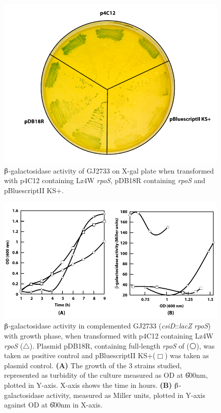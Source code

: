\begin{figure}[tbp]
\begin{narrow}{-1in}{-1in}
\centering
\includegraphics{figures/chap5_csid_lacz}
\end{narrow}
\caption[$\betaup$-galactosidase activity of GJ2733 on X-gal
plate]{$\betaup$-galactosidase activity of GJ2733 on X-gal plate
when transformed with p4C12 containing Lz4W \emph{rpoS}, pDB18R
containing  \emph{rpoS} and pBluescriptII KS+.}
\label{chap5:csid_lacz}
\end{figure}





\begin{figure}[tbp]
\begin{narrow}{-1in}{-1in}
\centering
\includegraphics{figures/chap5_csid_lacz_graph}
\end{narrow}
\caption[$\betaup$-galatosidase activity in transformed
GJ2733]{$\betaup$-galactosidase activity in complemented GJ2733
(\emph{csiD}::\emph{lacZ} \emph{rpoS}) with growth phase, when
transformed with p4C12 containing Lz4W \emph{rpoS} ($\triangle$).
Plasmid pDB18R, containing full-length \emph{rpoS} of 
($\medcirc$), was taken as positive control and pBluescriptII
KS+($\Box$) was taken as plasmid control. \textbf{(A)} The growth
of the 3 strains studied, represented as turbidity of the culture
measured as OD at \U{600}{nm}, plotted in Y-axis. X-axis shows the
time in hours. \textbf{(B)} $\betaup$-galactosidase activity,
measured as Miller units, plotted in Y-axis against OD at
\U{600}{nm} in X-axis.} \label{chap5:csid_growth}
\end{figure}

